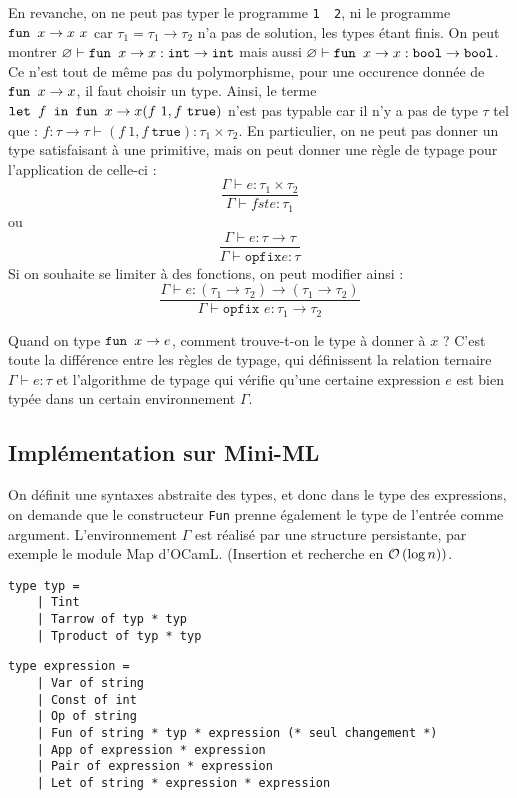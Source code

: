 \documentclass{cours}
\begin{document}
En revanche, on ne peut pas typer le programme \texttt{1 \ 2}, ni le programme $\texttt{fun } x \rightarrow x \ x$ car $\tau_{1} = \tau_{1} \rightarrow \tau_{2}$ n'a pas de solution, les types étant finis.
On peut montrer $\varnothing \vdash \texttt{fun } x \rightarrow x : \texttt{int} \rightarrow \texttt{int}$ mais aussi $\varnothing \vdash \texttt{fun } x \rightarrow x : \texttt{bool} \rightarrow \texttt{bool}$. Ce n'est tout de même pas du polymorphisme, pour une occurence donnée de $\texttt{fun } x \rightarrow x$, il faut choisir un type.
Ainsi, le terme $\letin{f}{\fun{x}{x}} (f\ 1, f\ \texttt{true})$ n'est pas typable car il n'y a pas de type $\tau$ tel que : $f : \tau \rightarrow \tau \vdash (f\ 1, f\ \texttt{true}) : \tau_{1} \times \tau_{2}$.
En particulier, on ne peut pas donner un type satisfaisant à une primitive, mais on peut donner une règle de typage pour l'application de celle-ci :
\[
    \frac{\Gamma \vdash e : \tau_{1} \times \tau_{2}}{\Gamma \vdash fst e : \tau_{1}}
\]
ou
\[
    \frac{\Gamma \vdash e: \tau \rightarrow \tau}{\Gamma \vdash \texttt{opfix} e : \tau}
\]
Si on souhaite se limiter à des fonctions, on peut modifier ainsi :
\[
    \frac{\Gamma \vdash e : \left(\tau_{1} \rightarrow \tau_{2}\right) \rightarrow \left(\tau_{1} \rightarrow \tau_{2}\right)}{\Gamma \vdash \texttt{opfix } e : \tau_{1} \rightarrow \tau_{2}}
\]

Quand on type $\texttt{fun } x \rightarrow e$, comment trouve-t-on le type à donner à $x$ ? C'est toute la différence entre les règles de typage, qui définissent la relation ternaire $\Gamma \vdash e : \tau$ et l'algorithme de typage qui vérifie qu'une certaine expression $e$ est bien typée dans un certain environnement $\Gamma$.

\subsection{Implémentation sur Mini-ML}
On définit une syntaxes abstraite des types, et donc dans le type des expressions, on demande que le constructeur \texttt{Fun} prenne également le type de l'entrée comme argument.
L'environnement $\Gamma$ est réalisé par une structure persistante, par exemple le module Map d'OCamL. (Insertion et recherche en $\mathcal{O}\left(\log n\right))$.

\begin{verbatim}
type typ =
    | Tint
    | Tarrow of typ * typ
    | Tproduct of typ * typ
\end{verbatim}

\begin{verbatim}
type expression =
    | Var of string
    | Const of int
    | Op of string
    | Fun of string * typ * expression (* seul changement *)
    | App of expression * expression
    | Pair of expression * expression
    | Let of string * expression * expression
\end{verbatim}
\end{document}
